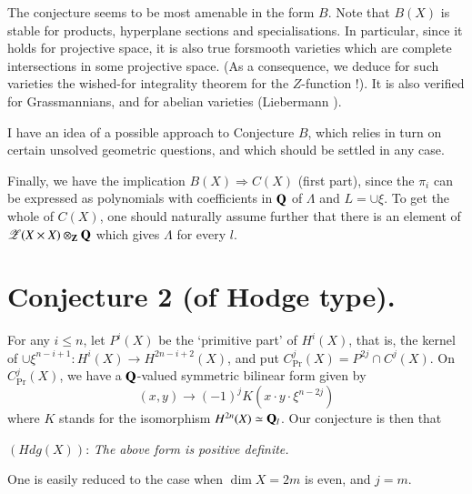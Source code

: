 The conjecture seems to be most amenable in the form $B$. Note that $B(X)$ is stable for products, hyperplane sections and specialisations. In particular, since it holds for projective space, it is also true for\pageoriginale smooth varieties which are complete intersections in some projective space. (As a consequence, we deduce for such varieties the wished-for integrality theorem for the $Z$-function !). It is also verified for Grassmannians, and for abelian varieties (Liebermann \cite{art09-key3}).

I have an idea of a possible approach to Conjecture $B$, which relies in turn on certain unsolved geometric questions, and which should be settled in any case.

Finally, we have the implication $B(X)\Rightarrow C(X)$ (first part), since the $\pi_{i}$ can be expressed as polynomials with coefficients in $\mathbf{Q}$ of $\Lambda$ and $L=\cup \xi$. To get the whole of $C(X)$, one should naturally assume further that there is an element of $\mathscr{Z}(X\times X)\otimes_{\mathbf{Z}}\mathbf{Q}$ which gives $\Lambda$ for every $l$.

\section{Conjecture 2 (of Hodge type).}\label{art09-sec4}

For any $i\leq n$, let $P^{i}(X)$ be the `primitive part' of $H^{i}(X)$, that is, the kernel of $\cup \xi^{n-i+1}:H^{i}(X)\to H^{2n-i+2}(X)$, and put $C^{j}_{\Pr}(X)=P^{2j}\cap C^{j}(X)$. On $C^{j}_{\Pr}(X)$, we have a $\mathbf{Q}$-valued symmetric bilinear form given by
$$
(x,y)\to (-1)^{j}K(x\cdot y\cdot \xi^{n-2j})
$$
where $K$ stands for the isomorphism $H^{2n}(X)\simeq \mathbf{Q}_{l}$. Our conjecture is then that

$(Hdg(X))$: {\em The above form is positive definite.}

One is easily reduced to the case when $\dim X=2m$ is even, and $j=m$.

\eject

